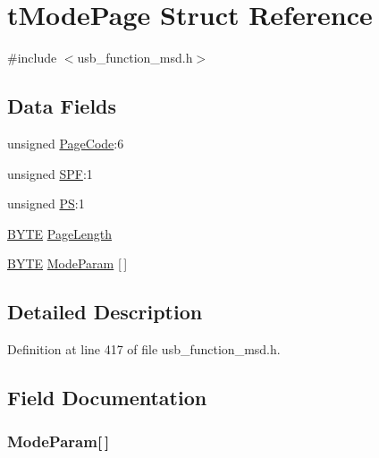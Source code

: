 \hypertarget{structt_mode_page}{}\section{t\+Mode\+Page Struct Reference}
\label{structt_mode_page}


{\ttfamily \#include $<$usb\+\_\+function\+\_\+msd.\+h$>$}

\subsection*{Data Fields}
\begin{DoxyCompactItemize}
\item 
unsigned \hyperlink{structt_mode_page_a229669906e282bdb7f7dc755fb1ebe80}{Page\+Code}\+:6
\item 
unsigned \hyperlink{structt_mode_page_aa7ac799bd74741a57afbbe1e60144baf}{S\+P\+F}\+:1
\item 
unsigned \hyperlink{structt_mode_page_a64b873122caea78d170d453815ba2b6d}{P\+S}\+:1
\item 
\hyperlink{_generic_type_defs_8h_a4ae1dab0fb4b072a66584546209e7d58}{B\+Y\+T\+E} \hyperlink{structt_mode_page_a40d0d13549ac834ee9aade48efafe4bc}{Page\+Length}
\item 
\hyperlink{_generic_type_defs_8h_a4ae1dab0fb4b072a66584546209e7d58}{B\+Y\+T\+E} \hyperlink{structt_mode_page_a78743978e830c7165522fea67170dd67}{Mode\+Param} \mbox{[}$\,$\mbox{]}
\end{DoxyCompactItemize}


\subsection{Detailed Description}


Definition at line 417 of file usb\+\_\+function\+\_\+msd.\+h.



\subsection{Field Documentation}
\hypertarget{structt_mode_page_a78743978e830c7165522fea67170dd67}{}
\subsubsection[{Mode\+Param}]{ Mode\+Param\mbox{[}$\,$\mbox{]}}\label{structt_mode_page_a78743978e830c7165522fea67170dd67}



